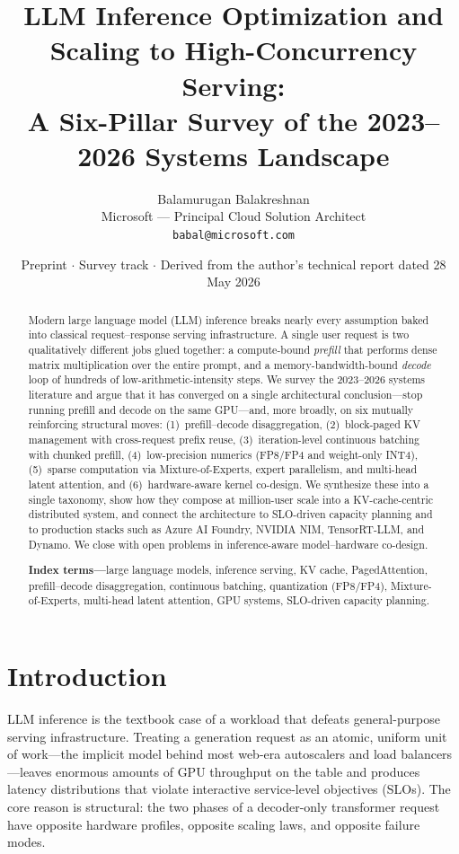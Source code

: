 \documentclass[11pt]{article}
\title{\bfseries LLM Inference Optimization and Scaling to High-Concurrency Serving:\\[2pt]
\large A Six-Pillar Survey of the 2023--2026 Systems Landscape}
\author{Balamurugan Balakreshnan\\
\normalsize Microsoft --- Principal Cloud Solution Architect\\
\normalsize \texttt{babal@microsoft.com}}
\date{Preprint $\cdot$ Survey track $\cdot$ Derived from the author's technical report dated 28 May 2026}
\begin{document}
\maketitle

\begin{abstract}
\noindent
Modern large language model (LLM) inference breaks nearly every assumption baked into classical
request--response serving infrastructure. A single user request is two qualitatively different jobs
glued together: a compute-bound \emph{prefill} that performs dense matrix multiplication over the entire
prompt, and a memory-bandwidth-bound \emph{decode} loop of hundreds of low-arithmetic-intensity steps.
We survey the 2023--2026 systems literature and argue that it has converged on a single architectural
conclusion---stop running prefill and decode on the same GPU---and, more broadly, on six mutually
reinforcing structural moves: (1)~prefill--decode disaggregation, (2)~block-paged KV management with
cross-request prefix reuse, (3)~iteration-level continuous batching with chunked prefill, (4)~low-precision
numerics (FP8/FP4 and weight-only INT4), (5)~sparse computation via Mixture-of-Experts, expert parallelism,
and multi-head latent attention, and (6)~hardware-aware kernel co-design. We synthesize these into a single
taxonomy, show how they compose at million-user scale into a KV-cache-centric distributed system, and connect
the architecture to SLO-driven capacity planning and to production stacks such as Azure AI Foundry, NVIDIA
NIM, TensorRT-LLM, and Dynamo. We close with open problems in inference-aware model--hardware co-design.

\vspace{6pt}
\noindent\textbf{Index terms---}large language models, inference serving, KV cache, PagedAttention,
prefill--decode disaggregation, continuous batching, quantization (FP8/FP4), Mixture-of-Experts,
multi-head latent attention, GPU systems, SLO-driven capacity planning.
\end{abstract}

\section{Introduction}
LLM inference is the textbook case of a workload that defeats general-purpose serving infrastructure.
Treating a generation request as an atomic, uniform unit of work---the implicit model behind most web-era
autoscalers and load balancers---leaves enormous amounts of GPU throughput on the table and produces latency
distributions that violate interactive service-level objectives (SLOs). The core reason is structural: the
two phases of a decoder-only transformer request have opposite hardware profiles, opposite scaling laws, and
opposite failure modes.
\end{document}
